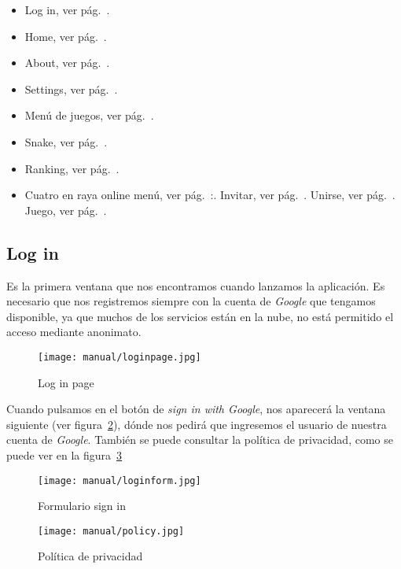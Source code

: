 \begin{itemize}
	\tightlist
	\item Log in, ver pág.~\pageref{login}.
	\item Home, ver pág.~\pageref{home}.
	\item About, ver pág.~\pageref{about}.
	\item Settings, ver pág.~\pageref{settings}.
	\item Menú de juegos, ver pág.~\pageref{menugames}.
	\item Snake, ver pág.~\pageref{snake}.
	\item Ranking, ver pág.~\pageref{rank}.
	\item Cuatro en raya online menú, ver pág.~\pageref{cuatromenu}:.
	\subitem Invitar, ver pág.~\pageref{cuatroinvitar}.
	\subitem Unirse, ver pág.~\pageref{cuatrounir}.
	\subitem Juego, ver pág.~\pageref{cuatrojuego}.
\end{itemize}

\subsection{Log in}\label{login}
Es la primera ventana que nos encontramos cuando lanzamos la aplicación. Es necesario que nos registremos siempre con la cuenta de \emph{Google} que tengamos disponible, ya que muchos de los servicios están en la nube, no está permitido el acceso mediante anonimato.

\begin{figure}%
	\centering
	\texttt{[image: manual/loginpage.jpg]}
	\caption{Log in page}\label{fig:loginpage}
\end{figure}

Cuando pulsamos en el botón de \emph{sign in with Google}, nos aparecerá la ventana siguiente (ver figura~\ref{fig:formlog}), dónde nos pedirá que ingresemos el usuario de nuestra cuenta de \emph{Google}. También se puede consultar la política de privacidad, como se puede ver en la figura~\ref{fig:policy}

\begin{figure}%
	\centering
	\texttt{[image: manual/loginform.jpg]}
	\caption{Formulario sign in}\label{fig:formlog}
\end{figure}

\begin{figure}%
	\centering
	\texttt{[image: manual/policy.jpg]}
	\caption{Política de privacidad}\label{fig:policy}
\end{figure}

